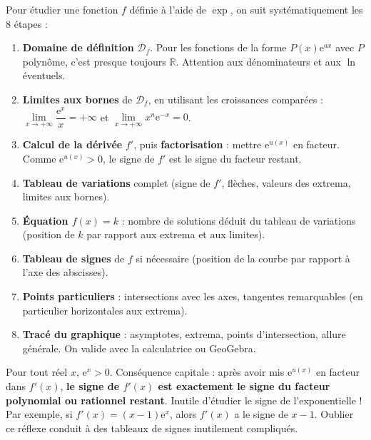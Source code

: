 \documentclass[11pt]{article}
\newcommand{\cle}[1]{{\popxbold\color{popdark}#1}}
\begin{document}
\begin{methode}
Pour étudier une fonction $f$ définie à l'aide de $\exp$, on suit systématiquement les 8 étapes :
\begin{enumerate}
\item \textbf{Domaine de définition} $\mathcal{D}_f$. Pour les fonctions de la forme $P(x)\mathrm{e}^{ax}$ avec $P$ polynôme, c'est presque toujours $\mathbb{R}$. Attention aux dénominateurs et aux $\ln$ éventuels.
\item \textbf{Limites aux bornes} de $\mathcal{D}_f$, en utilisant les \cle{croissances comparées} : $\lim\limits_{x\to+\infty}\dfrac{\mathrm{e}^{x}}{x}=+\infty$ et $\lim\limits_{x\to+\infty}x^{n}\mathrm{e}^{-x}=0$.
\item \textbf{Calcul de la dérivée} $f'$, puis \textbf{factorisation} : mettre $\mathrm{e}^{u(x)}$ en facteur. Comme $\mathrm{e}^{u(x)}>0$, le signe de $f'$ est le signe du facteur restant.
\item \textbf{Tableau de variations} complet (signe de $f'$, flèches, valeurs des extrema, limites aux bornes).
\item \textbf{Équation $f(x)=k$} : nombre de solutions déduit du tableau de variations (position de $k$ par rapport aux extrema et aux limites).
\item \textbf{Tableau de signes} de $f$ si nécessaire (position de la courbe par rapport à l'axe des abscisses).
\item \textbf{Points particuliers} : intersections avec les axes, tangentes remarquables (en particulier horizontales aux extrema).
\item \textbf{Tracé du graphique} : asymptotes, extrema, points d'intersection, allure générale. On valide avec la calculatrice ou GeoGebra.
\end{enumerate}
\end{methode}

\begin{attention}
Pour tout réel $x$, $\mathrm{e}^{x}>0$. Conséquence capitale : après avoir mis $\mathrm{e}^{u(x)}$ en facteur dans $f'(x)$, \textbf{le signe de $f'(x)$ est exactement le signe du facteur polynomial ou rationnel restant}. Inutile d'étudier le signe de l'exponentielle ! Par exemple, si $f'(x)=(x-1)\mathrm{e}^{x}$, alors $f'(x)$ a le signe de $x-1$. Oublier ce réflexe conduit à des tableaux de signes inutilement compliqués.
\end{attention}
\end{document}

